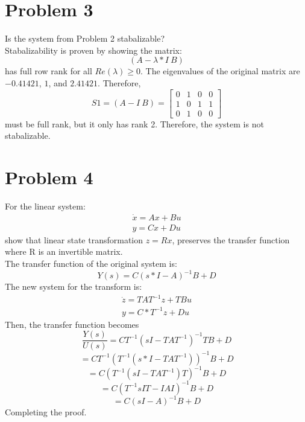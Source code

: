 \documentclass{article}
\begin{document}
\section*{Problem 3}
Is the system from Problem 2 stabalizable?\\
Stabalizability is proven by showing the matrix:
\[(A-\lambda*I\ B)\]
has full row rank for all $Re(\lambda)\geq 0$. The eigenvalues of the original matrix are $-0.41421$, $1$, and $2.41421$. Therefore,
\[S1=(A-I\ B)=\begin{bmatrix}0&1&0&0\\1&0&1&1\\0&1&0&0\end{bmatrix}\]
must be full rank, but it only has rank 2. Therefore, the system is not stabalizable.


\section*{Problem 4}
For the linear system:
\[\begin{array}{c}\dot{x}=Ax+Bu\\y=Cx+Du\end{array}\]
show that linear state transformation $z=Rx$, preserves the transfer function where R is an invertible matrix.\\
The transfer function of the original system is:
\[Y(s)=C(s*I-A)^{-1}B+D\]
The new system for the transform is:
\[\begin{array}{c}\dot{z}=TAT^{-1}z+TBu\\y=C*T^{-1}z+Du\end{array}\]
Then, the transfer function becomes
\[\frac{Y(s)}{U(s)}=CT^{-1}(sI-TAT^{-1})^{-1}TB+D\]
\[=CT^{-1}(T^{-1}(s*I-TAT^{-1}))^{-1}B+D\]
\[=C(T^{-1}(sI-TAT^{-1})T)^{-1}B+D\]
\[=C(T^{-1}sIT-IAI)^{-1}B+D\]
\[=C(sI-A)^{-1}B+D\]
Completing the proof.
\end{document}
